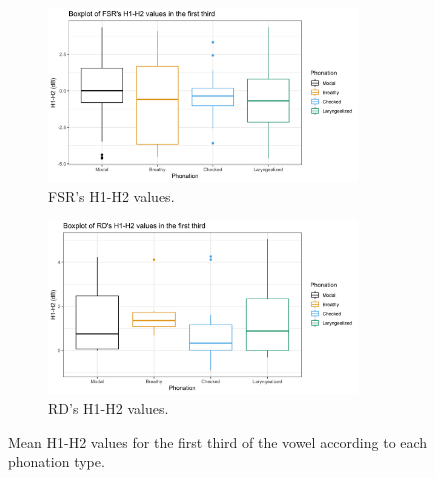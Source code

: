 \documentclass[12pt, letterpaper]{article}
\begin{document}
\begin{figure}[!ht]
	\centering
	\begin{subfigure}{.5\textwidth}
		\centering
		\includegraphics[width=0.9\textwidth]{../mean_FSR_h1h2_1st.png}
		\caption{FSR's H1-H2 values.}
		\label{fig:FSRh1h2first} 
	\end{subfigure}%
	\begin{subfigure}{.5\textwidth}
		\centering
		\includegraphics[width=0.9\textwidth]{../mean_RD_h1h2_1st.png}
		\caption{RD's H1-H2 values.}
		\label{fig:RDh1h2first} 
	\end{subfigure}
	\caption{Mean H1-H2 values for the first third of the vowel according to each phonation type. }
	\label{fig:h1h2first}
\end{figure}
\end{document}
